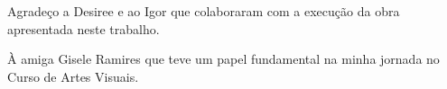 \begin{agradecimento}

Agradeço a Desiree e ao Igor que colaboraram com a execução da obra apresentada neste trabalho.

À amiga Gisele Ramires que teve um papel fundamental na minha jornada no Curso de Artes Visuais.

\end{agradecimento}

